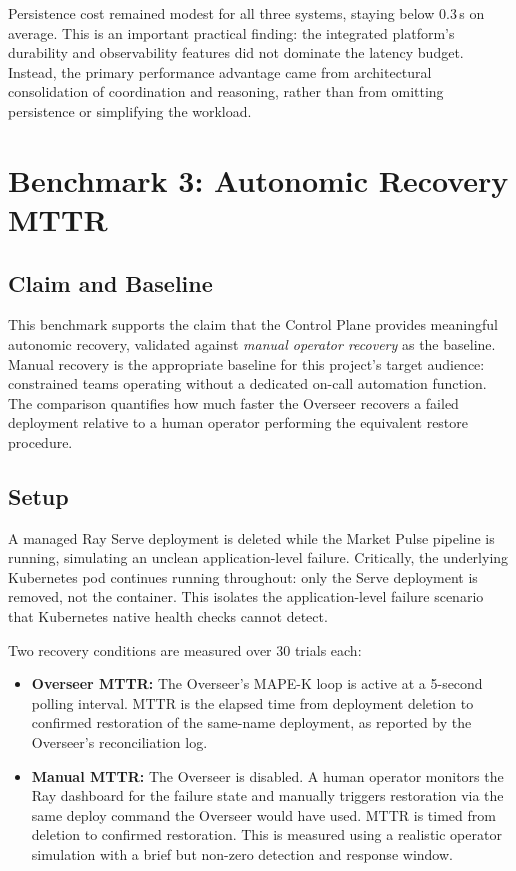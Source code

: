 \documentclass[12pt, a4paper]{report}
\begin{document}
Persistence cost remained modest for all three systems, staying below 0.3\,s on average.
This is an important practical finding: the integrated platform's durability and
observability features did not dominate the latency budget. Instead, the primary
performance advantage came from architectural consolidation of coordination and
reasoning, rather than from omitting persistence or simplifying the workload.

\section{Benchmark 3: Autonomic Recovery MTTR}
\label{sec:exp_mttr}

\subsection{Claim and Baseline}
\label{ssec:exp3_claim}

This benchmark supports the claim that the Control Plane provides meaningful
autonomic recovery, validated against \emph{manual operator recovery} as the baseline.
Manual recovery is the appropriate baseline for this project's target audience:
constrained teams operating without a dedicated on-call automation function.
The comparison quantifies how much faster the Overseer recovers a failed deployment
relative to a human operator performing the equivalent restore procedure.

\subsection{Setup}
\label{ssec:exp3_setup}

A managed Ray Serve deployment is deleted while the Market Pulse pipeline is running,
simulating an unclean application-level failure.
Critically, the underlying Kubernetes pod continues running throughout: only the Serve
deployment is removed, not the container.
This isolates the application-level failure scenario that Kubernetes native health
checks cannot detect.

Two recovery conditions are measured over 30 trials each:

\begin{itemize}
  \item \textbf{Overseer MTTR:} The Overseer's MAPE-K loop is active at a 5-second
  polling interval. MTTR is the elapsed time from deployment deletion to confirmed
  restoration of the same-name deployment, as reported by the Overseer's
  reconciliation log.
  \item \textbf{Manual MTTR:} The Overseer is disabled. A human operator monitors
  the Ray dashboard for the failure state and manually triggers restoration via the
  same deploy command the Overseer would have used. MTTR is timed from deletion to
  confirmed restoration. This is measured using a realistic operator simulation
  with a brief but non-zero detection and response window.
\end{itemize}
\end{document}

